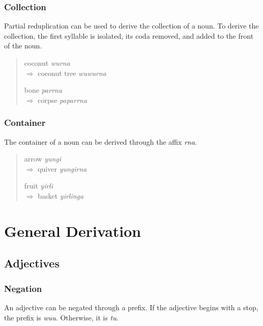 \subsubsection{Collection}

Partial reduplication can be used to derive the collection of a noun. To derive
the collection, the first syllable is isolated, its coda removed, and added to
the front of the noun.

\begin{quote}
\begin{multicols}{2}
coconut \textit{wurna}\\
$\Rightarrow$ coconut tree \textit{wuwurna}

bone \textit{parrna}\\
$\Rightarrow$ corpse \textit{paparrna}
\end{multicols}
\end{quote}

\subsubsection{Container}

The container of a noun can be derived through the affix \textit{rna}.

\begin{quote}
\begin{multicols}{2}
arrow \textit{yungi}\\
$\Rightarrow$ quiver \textit{yungirna}

fruit \textit{yirli}\\
$\Rightarrow$ basket \textit{yirlinga}
\end{multicols}
\end{quote}

\section{General Derivation}

\subsection{Adjectives}

\subsubsection{Negation}

An adjective can be negated through a prefix. If the adjective begins with a
stop, the prefix is \textit{wuu}. Otherwise, it is \textit{tu}.

